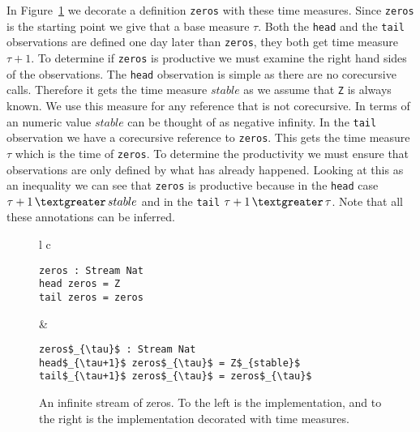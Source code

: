 In Figure~\ref{fig:zeros} we decorate a definition \texttt{zeros} with these time measures. Since \texttt{zeros} is the starting point we give that a base measure $\tau$. Both the \texttt{head} and the \texttt{tail} observations are defined one day later than \texttt{zeros}, they both get time measure $\tau+1$. To determine if \texttt{zeros} is productive we must examine the right hand sides of the observations. The \texttt{head} observation is simple as there are no corecursive calls. Therefore it gets the time measure $stable$ as we assume that \texttt{Z} is always known. We use this measure for any reference that is not corecursive. In terms of an numeric value $stable$ can be thought of as negative infinity. In the \texttt{tail} observation we have a corecursive reference to \texttt{zeros}. This gets the time measure $\tau$ which is the time of \texttt{zeros}. To determine the productivity we must ensure that observations are only defined by what has already happened. Looking at this as an inequality we can see that \texttt{zeros} is productive because in the \texttt{head} case $\tau+1\,\textgreater\,stable$ and in the \texttt{tail} $\tau+1\,\textgreater\,\tau$. Note that all these annotations can be inferred.

\begin{figure}
\begin{tabular}{l c}

\begin{minipage}{3in}
\begin{Verbatim}[commandchars=\\\{\},codes={\catcode`$=3\catcode`_=8}]
zeros : Stream Nat
head zeros = Z
tail zeros = zeros
\end{Verbatim}
\end{minipage} &
\begin{minipage}{3in}
\begin{Verbatim}[commandchars=\\\{\},codes={\catcode`$=3\catcode`_=8}]
zeros$_{\tau}$ : Stream Nat
head$_{\tau+1}$ zeros$_{\tau}$ = Z$_{stable}$
tail$_{\tau+1}$ zeros$_{\tau}$ = zeros$_{\tau}$
\end{Verbatim}
\end{minipage}

\end{tabular}
\caption{An infinite stream of zeros. To the left is the implementation, and to the right is the implementation decorated with time measures.}
\label{fig:zeros}
\end{figure}


